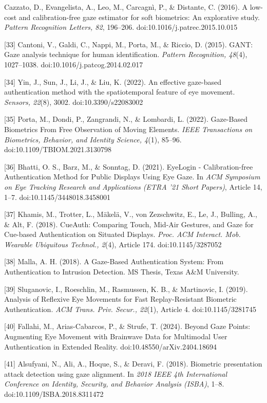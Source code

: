 \documentclass[12pt]{report}
\begin{document}
\begin{raggedright}
[32] Cazzato, D., Evangelista, A., Leo, M., Carcagnì, P., \& Distante, C. (2016). A low-cost and calibration-free gaze estimator for soft biometrics: An explorative study. \textit{Pattern Recognition Letters, 82}, 196–206. doi:10.1016/j.patrec.2015.10.015

[33] Cantoni, V., Galdi, C., Nappi, M., Porta, M., \& Riccio, D. (2015). GANT: Gaze analysis technique for human identification. \textit{Pattern Recognition, 48}(4), 1027–1038. doi:10.1016/j.patcog.2014.02.017

[34] Yin, J., Sun, J., Li, J., \& Liu, K. (2022). An effective gaze-based authentication method with the spatiotemporal feature of eye movement. \textit{Sensors, 22}(8), 3002. doi:10.3390/s22083002

[35] Porta, M., Dondi, P., Zangrandi, N., \& Lombardi, L. (2022). Gaze-Based Biometrics From Free Observation of Moving Elements. \textit{IEEE Transactions on Biometrics, Behavior, and Identity Science, 4}(1), 85–96. doi:10.1109/TBIOM.2021.3130798

[36] Bhatti, O. S., Barz, M., \& Sonntag, D. (2021). EyeLogin - Calibration-free Authentication Method for Public Displays Using Eye Gaze. In \textit{ACM Symposium on Eye Tracking Research and Applications (ETRA '21 Short Papers)}, Article 14, 1–7. doi:10.1145/3448018.3458001

[37] Khamis, M., Trotter, L., Mäkelä, V., von Zezschwitz, E., Le, J., Bulling, A., \& Alt, F. (2018). CueAuth: Comparing Touch, Mid-Air Gestures, and Gaze for Cue-based Authentication on Situated Displays. \textit{Proc. ACM Interact. Mob. Wearable Ubiquitous Technol., 2}(4), Article 174. doi:10.1145/3287052

[38] Malla, A. H. (2018). A Gaze-Based Authentication System: From Authentication to Intrusion Detection. MS Thesis, Texas A\&M University.

[39] Sluganovic, I., Roeschlin, M., Rasmussen, K. B., \& Martinovic, I. (2019). Analysis of Reflexive Eye Movements for Fast Replay-Resistant Biometric Authentication. \textit{ACM Trans. Priv. Secur., 22}(1), Article 4. doi:10.1145/3281745

[40] Fallahi, M., Arias-Cabarcos, P., \& Strufe, T. (2024). Beyond Gaze Points: Augmenting Eye Movement with Brainwave Data for Multimodal User Authentication in Extended Reality. doi:10.48550/arXiv.2404.18694

[41] Alsufyani, N., Ali, A., Hoque, S., \& Deravi, F. (2018). Biometric presentation attack detection using gaze alignment. In \textit{2018 IEEE 4th International Conference on Identity, Security, and Behavior Analysis (ISBA)}, 1–8. doi:10.1109/ISBA.2018.8311472


\end{raggedright}
\end{document}
